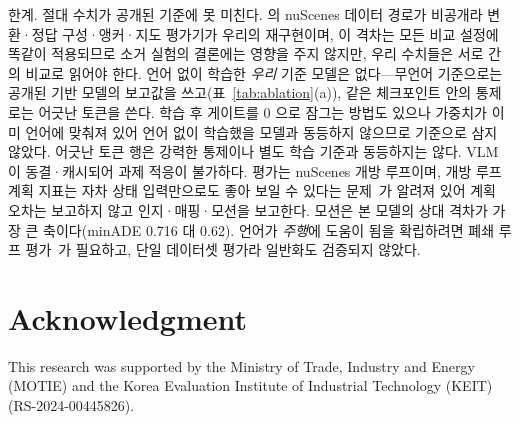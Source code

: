 \documentclass[conference]{IEEEtran}
\newcommand{\measured}[1]{#1}
\begin{document}
한계. 절대 수치가 공개된 기준에 못 미친다. \cite{hipad2025}의 nuScenes 데이터
경로가 비공개라 변환·정답 구성·앵커·지도 평가기가 우리의 재구현이며, 이 격차는 모든 비교 설정에 똑같이 적용되므로 소거 실험의 결론에는 영향을 주지 않지만,
우리 수치들은 서로 간의 비교로 읽어야 한다. 언어
없이 학습한 \emph{우리} 기준 모델은 없다---무언어 기준으로는 공개된 기반 모델의 보고값을
쓰고(표~\ref{tab:ablation}(a)), 같은 체크포인트 안의 통제로는 어긋난 토큰을 쓴다. 학습
후 게이트를 0 으로 잠그는 방법도 있으나 가중치가 이미 언어에 맞춰져 있어 언어 없이
학습했을 모델과 동등하지 않으므로 기준으로 삼지 않았다. 어긋난 토큰 행은 강력한 통제이나
별도 학습 기준과 동등하지는 않다. VLM 이 동결·캐시되어 과제 적응이 불가하다. 평가는 nuScenes 개방 루프이며, 개방 루프 계획 지표는 자차 상태 입력만으로도 좋아 보일
수 있다는 문제~\cite{li2024egostatus}가 알려져 있어 계획 오차는 보고하지 않고
인지·매핑·모션을 보고한다. 모션은 본 모델의 상대 격차가 가장 큰 축이다(minADE
\measured{0.716} 대 \measured{0.62}). 언어가 \emph{주행}에 도움이 됨을 확립하려면 폐쇄 루프
평가~\cite{jia2024bench2drive,dauner2024navsim}가 필요하고, 단일 데이터셋 평가라
일반화도 검증되지 않았다.

\section*{Acknowledgment}
This research was supported by the Ministry of Trade, Industry and Energy
(MOTIE) and the Korea Evaluation Institute of Industrial Technology (KEIT)
(RS-2024-00445826).



\end{document}

